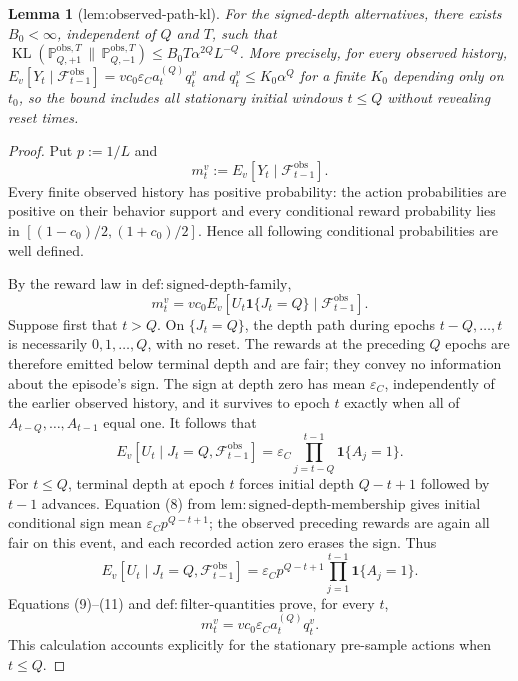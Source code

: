 \documentclass{article}
\newtheorem{lemma}{Lemma}
\begin{document}
\begin{lemma}[lem:observed-path-kl]\label{lem:observed-path-kl}
For the signed-depth alternatives, there exists \(B_0<\infty\), independent of \(Q\) and \(T\), such that \(\operatorname{KL}(\mathbb P_{Q,+1}^{\mathrm{obs},T}\,\|\,\mathbb P_{Q,-1}^{\mathrm{obs},T})\le B_0T\alpha^{2Q}L^{-Q}\). More precisely, for every observed history, \(E_v[Y_t\mid\mathcal F_{t-1}^{\mathrm{obs}}]=vc_0\varepsilon_Ca_t^{(Q)}q_t^v\) and \(q_t^v\le K_0\alpha^Q\) for a finite \(K_0\) depending only on \(t_0\), so the bound includes all stationary initial windows \(t\le Q\) without revealing reset times.
\end{lemma}
\begin{proof}
Put \(p:=1/L\) and
\[
 m_t^v:=E_v[Y_t\mid\mathcal F_{t-1}^{\mathrm{obs}}].
\]
Every finite observed history has positive probability: the action probabilities are positive on their behavior support and every conditional reward probability lies in \([(1-c_0)/2,(1+c_0)/2]\).  Hence all following conditional probabilities are well defined.

By the reward law in \(\mathrm{def{:}signed\text{-}depth\text{-}family}\),
\[
 m_t^v=vc_0E_v[U_t\mathbf1\{J_t=Q\}\mid\mathcal F_{t-1}^{\mathrm{obs}}]. \tag{9}
\]
Suppose first that \(t>Q\).  On \(\{J_t=Q\}\), the depth path during epochs \(t-Q,\ldots,t\) is necessarily \(0,1,\ldots,Q\), with no reset.  The rewards at the preceding \(Q\) epochs are therefore emitted below terminal depth and are fair; they convey no information about the episode's sign.  The sign at depth zero has mean \(\varepsilon_C\), independently of the earlier observed history, and it survives to epoch \(t\) exactly when all of \(A_{t-Q},\ldots,A_{t-1}\) equal one.  It follows that
\[
 E_v[U_t\mid J_t=Q,\mathcal F_{t-1}^{\mathrm{obs}}]
 =\varepsilon_C\prod_{j=t-Q}^{t-1}\mathbf1\{A_j=1\}. \tag{10}
\]
For \(t\le Q\), terminal depth at epoch \(t\) forces initial depth \(Q-t+1\) followed by \(t-1\) advances.  Equation (8) from \(\mathrm{lem{:}signed\text{-}depth\text{-}membership}\) gives initial conditional sign mean \(\varepsilon_Cp^{Q-t+1}\); the observed preceding rewards are again all fair on this event, and each recorded action zero erases the sign.  Thus
\[
 E_v[U_t\mid J_t=Q,\mathcal F_{t-1}^{\mathrm{obs}}]
 =\varepsilon_Cp^{Q-t+1}\prod_{j=1}^{t-1}\mathbf1\{A_j=1\}. \tag{11}
\]
Equations (9)--(11) and \(\mathrm{def{:}filter\text{-}quantities}\) prove, for every \(t\),
\[
 m_t^v=vc_0\varepsilon_Ca_t^{(Q)}q_t^v. \tag{12}
\]
This calculation accounts explicitly for the stationary pre-sample actions when \(t\le Q\).


\end{proof}
\end{document}
